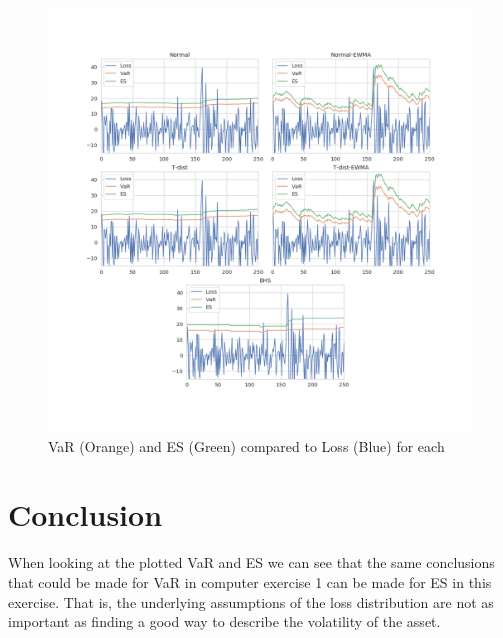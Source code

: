 \documentclass[a4paper]{article}
\begin{document}
\begin{figure}[H]
    \includegraphics[width=\textwidth]{plot.png}
    \caption{VaR (Orange) and ES (Green) compared to Loss (Blue) for each}
    \label{var2}
\end{figure}

\section{Conclusion}
When looking at the plotted VaR and ES we can see that the same conclusions that could be made for VaR in computer exercise 1 can be made for ES in this exercise. That is, the underlying assumptions of the loss distribution are not as important as finding a good way to describe the volatility of the asset. 
\end{document}
